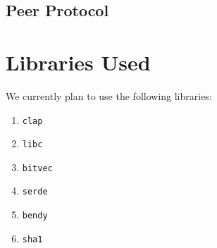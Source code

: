 \documentclass{article}
\begin{document}
    \subsection{Peer Protocol}

    \clearpage
    \appendix
    \section{Libraries Used}

    We currently plan to use the following libraries:
    \begin{multicols}{2}
    \begin{enumerate}
        \item \verb|clap|
        \item \verb|libc|
        \item \verb|bitvec|
        \item \verb|serde|
        \item \verb|bendy|
        \item \verb|sha1|
    \end{enumerate}
    \end{multicols}
\end{document}
